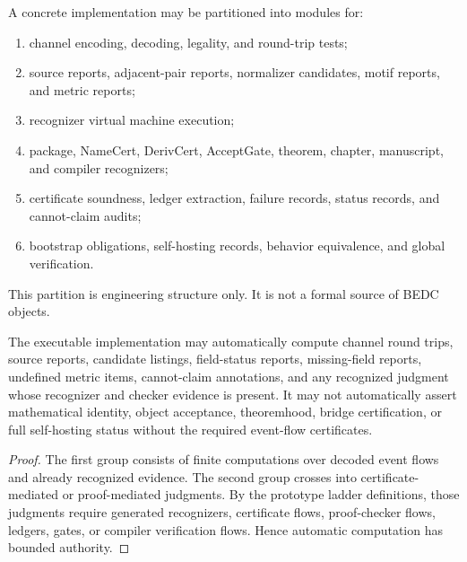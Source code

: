 \begin{definition}
\label{def:programmatic-module-partition}
A concrete implementation may be partitioned into modules for:
\begin{enumerate}
\item channel encoding, decoding, legality, and round-trip tests;
\item source reports, adjacent-pair reports, normalizer candidates, motif reports, and metric reports;
\item recognizer virtual machine execution;
\item package, NameCert, DerivCert, AcceptGate, theorem, chapter, manuscript, and compiler recognizers;
\item certificate soundness, ledger extraction, failure records, status records, and cannot-claim audits;
\item bootstrap obligations, self-hosting records, behavior equivalence, and global verification.
\end{enumerate}
This partition is engineering structure only. It is not a formal source of BEDC objects.
\end{definition}

\begin{proposition}
\label{prop:programmatic-automatic-computation-bounded-authority}
The executable implementation may automatically compute channel round trips, source reports, candidate listings, field-status reports, missing-field reports, undefined metric items, cannot-claim annotations, and any recognized judgment whose recognizer and checker evidence is present. It may not automatically assert mathematical identity, object acceptance, theoremhood, bridge certification, or full self-hosting status without the required event-flow certificates.
\end{proposition}

\begin{proof}
The first group consists of finite computations over decoded event flows and already recognized evidence. The second group crosses into certificate-mediated or proof-mediated judgments. By the prototype ladder definitions, those judgments require generated recognizers, certificate flows, proof-checker flows, ledgers, gates, or compiler verification flows. Hence automatic computation has bounded authority.
\end{proof}

